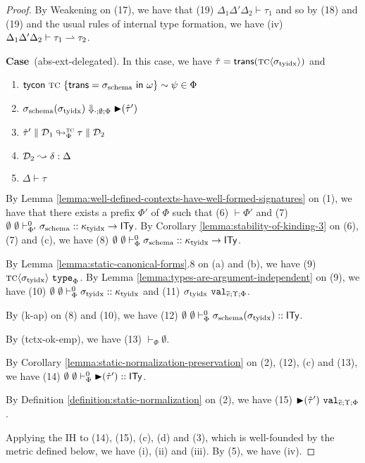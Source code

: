 \documentclass[12pt]{article}
\newcommand{\pfcase}[1]{\textbf{Case}~#1. }
\begin{document}
\begin{proof}
By Weakening on (17), we have that (19) $\Delta_1\Delta'\Delta_2 \vdash \tau_1$ and so by (18) and (19) and the usual rules of internal type formation, we have (iv) $\Delta_1\Delta'\Delta_2 \vdash \tau_1 \rightharpoonup \tau_2$.

\pfcase{(abs-ext-delegated)} In this case, we have $\hat{\tau}={\sf trans}({\textsc{tc}}\langle\sigma_\text{tyidx}\rangle)$ and \begin{enumerate}[(1)]
\item ${\sf tycon}~\textsc{tc} ~\{{\sf trans}=\sigma_\text{schema}~{\sf in}~\omega\} \sim \psi \in \Phi$
\item $\sigma_\text{schema}(\sigma_\text{tyidx}) \Downarrow_{\cdot;\emptyset;\Phi} {\blacktriangleright}(\hat{\tau}')$
\item $\hat{\tau}' \parallel \mathcal{D}_1 \looparrowright_{\Phi}^{\textsc{tc}} \tau \parallel \mathcal{D}_2$
\item $\mathcal{D}_2 \leadsto \delta : \Delta$
\item $\Delta \vdash \tau$
\end{enumerate}

By Lemma \ref{lemma:well-defined-contexts-have-well-formed-signatures} on (1), we have that there exists a prefix $\Phi'$ of $\Phi$ such that (6) $\vdash \Phi'$ and (7) $\emptyset~\emptyset \vdash_{\Phi'}^{0} \sigma_\text{schema} :: \kappa_\text{tyidx} \rightarrow {\sf ITy}$. By Corollary \ref{lemma:stability-of-kinding-3} on (6), (7) and (c), we have (8) $\emptyset~\emptyset \vdash_{\Phi}^{0} \sigma_\text{schema} :: \kappa_\text{tyidx} \rightarrow {\sf ITy}$.

By Lemma \ref{lemma:static-canonical-forms}.8 on (a) and (b), we have (9) ${\textsc{tc}}\langle\sigma_\text{tyidx}\rangle~\mathtt{type}_{\Phi}$. By Lemma \ref{lemma:types-are-argument-independent} on (9), we have (10) $\emptyset~\emptyset \vdash_{\Phi}^{0} \sigma_\text{tyidx} :: \kappa_\text{tyidx}$ and (11) $\sigma_\text{tyidx}~\mathtt{val}_{\overline{e};\Upsilon;\Phi}$.

By (k-ap) on (8) and (10), we have (12) $\emptyset~\emptyset \vdash_{\Phi}^{0} \sigma_\text{schema}(\sigma_\text{tyidx}) :: {\sf ITy}$.

By (tctx-ok-emp), we have (13) $\vdash_\Phi \emptyset$.

By Corollary \ref{lemma:static-normalization-preservation} on (2), (12), (c) and (13), we have (14) $\emptyset~\emptyset \vdash_{\Phi}^{0} {\blacktriangleright}(\hat{\tau}') :: {\sf ITy}$.

By Definition \ref{definition:static-normalization} on (2), we have (15) ${\blacktriangleright}(\hat{\tau}')~\mathtt{val}_{\overline{e};\Upsilon;\Phi}$. 

Applying the IH to (14), (15), (c), (d) and (3), which is well-founded by the metric defined below, we have (i), (ii) and (iii). By (5), we have (iv).


\end{proof}
\end{document}
